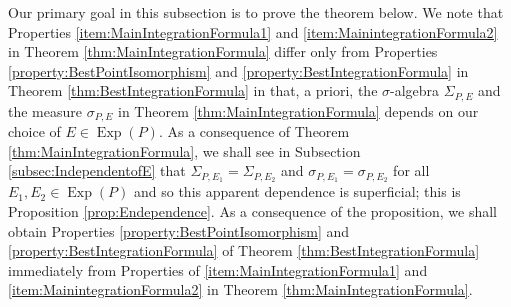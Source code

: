 \documentclass[11pt]{article}
\theoremstyle{remark}
\newcommand\Exp{\operatorname{Exp}}
\begin{document}
\noindent Our primary goal in this subsection is to prove the theorem below. We note that Properties \ref{item:MainIntegrationFormula1} and \ref{item:MainintegrationFormula2} in Theorem \ref{thm:MainIntegrationFormula} differ only from Properties \ref{property:BestPointIsomorphism} and \ref{property:BestIntegrationFormula} in Theorem \ref{thm:BestIntegrationFormula} in that, a priori, the $\sigma$-algebra $\Sigma_{P,E}$ and the measure $\sigma_{P,E}$ in Theorem \ref{thm:MainIntegrationFormula} depends on our choice of $E\in\Exp(P)$. As a consequence of Theorem \ref{thm:MainIntegrationFormula}, we shall see in Subsection \ref{subsec:IndependentofE} that $\Sigma_{P,E_1}=\Sigma_{P,E_2}$ and $\sigma_{P,E_1}=\sigma_{P,E_2}$ for all $E_1,E_2\in\Exp(P)$ and so this apparent dependence is superficial; this is Proposition \ref{prop:Endependence}. As a consequence of the proposition, we shall obtain Properties \ref{property:BestPointIsomorphism} and \ref{property:BestIntegrationFormula} of Theorem \ref{thm:BestIntegrationFormula} immediately from Properties of \ref{item:MainIntegrationFormula1} and \ref{item:MainintegrationFormula2} in Theorem \ref{thm:MainIntegrationFormula}.
\end{document}
